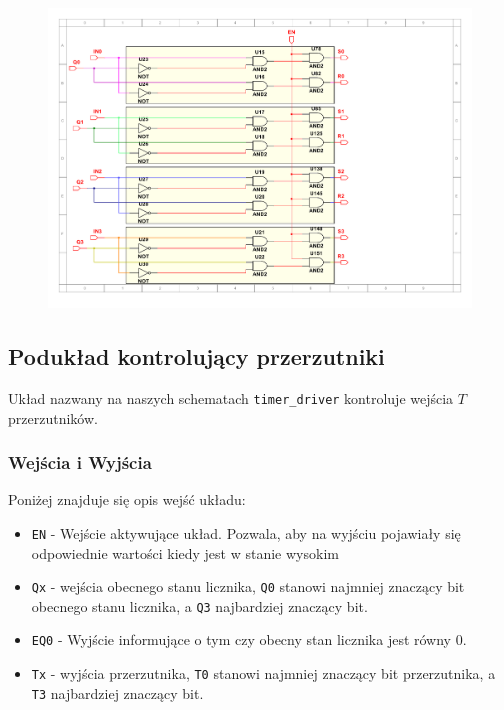\documentclass[a4paper]{article}
\begin{document}
\begin{figure}[H]
    \centering
    \includegraphics[width=\textwidth]{timer_setter_subsheet.pdf}
\end{figure}

\pagebreak
\subsection{Podukład kontrolujący przerzutniki}
Układ nazwany na naszych schematach \verb|timer_driver| kontroluje wejścia $T$ przerzutników.


\subsubsection{Wejścia i Wyjścia}
Poniżej znajduje się opis wejść układu:
\begin{itemize}
    \item \verb|EN| - Wejście aktywujące układ. Pozwala, aby na wyjściu pojawiały się odpowiednie wartości kiedy jest w stanie wysokim
    \item \verb|Qx| - wejścia obecnego stanu licznika, \verb|Q0| stanowi najmniej znaczący bit obecnego stanu licznika,
            a \verb|Q3| najbardziej znaczący bit.
\end{itemize}

\begin{itemize}
    \item \verb|EQ0| - Wyjście informujące o tym czy obecny stan licznika jest równy 0.
    \item \verb|Tx| - wyjścia przerzutnika, \verb|T0| stanowi najmniej znaczący bit przerzutnika,
    a \verb|T3| najbardziej znaczący bit.
\end{itemize}
\end{document}
